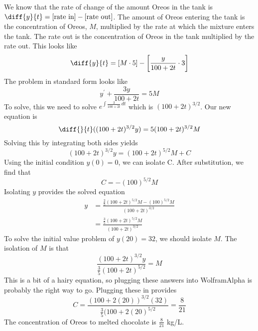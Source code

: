 \documentclass{article}
\begin{document}
\begin{enumerate}[label=\textbf{(3.\arabic*)}]
We know that the rate of change of the amount Oreos in the tank is $\diff{y}{t}=[\textrm{rate in}]-[\textrm{rate out}]$. The amount of Oreos entering the tank is the concentration of Oreos, $M$, multiplied by the rate at which the mixture enters the tank. The rate out is the concentration of Oreos in the tank multiplied by the rate out. This looks like 
\[\diff{y}{t} = [M\cdot5]-\left[\frac{y}{100+2t}\cdot3\right]\]
The problem in standard form looks like 
\[y^\prime+\frac{3y}{100+2t}=5M\]
To solve, this we need to solve $\displaystyle e^{\int \frac{3}{100+2t}\,dt}$ which is $(100+2t)^{3/2}$. Our new equation is 
\[\diff{ }{t}((100+2t)^{3/2}y) = 5(100+2t)^{3/2}M\]
Solving this by integrating both sides yields
\[(100+2t)^{3/2}y = (100+2t)^{5/2}M+C\]
Using the initial condition $y(0)=0$, we can isolate C. After substitution, we find that 
\[C = -(100)^{5/2}M\]
Isolating $y$ provides the solved equation
\begin{align*}
y &= \frac{\frac{2}{5}(100+2t)^{5/2}M-(100)^{5/2}M}{(100+2t)^{3/2}}\\
&= \frac{\frac{3}{5}(100+2t)^{5/2}M}{(100+2t)^{3/2}}
\end{align*}
To solve the initial value problem of $y(20)=32$, we should isolate $M$. The isolation of $M$ is that 
\[\frac{(100+2t)^{3/2}y}{\frac{3}{5}(100+2t)^{5/2}}=M\]
This is a bit of a hairy equation, so plugging these answers into WolframAlpha is probably the right way to go. Plugging these in provides
\[C = \frac{(100+2(20))^{3/2}(32)}{\frac{3}{5}(100+2(20)^{5/2}}=\frac{8}{21}\]
The concentration of Oreos to melted chocolate is $\frac{8}{21}$ kg/L.
\end{enumerate}
\end{document}
